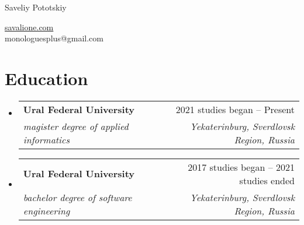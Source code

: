 \documentclass[letterpaper,11pt]{article}
\makeatletter
\newcommand{\resumeItem}[1]{
    \item{
                {#1 \vspace{-4pt}}
          }
}
\newcommand{\resumeSubheading}[4]{
    \vspace{-2pt}\item
    \begin{tabular*}{0.97\textwidth}[t]{l@{\extracolsep{\fill}}r}
        \textbf{#1} & #2 \\
        \textit{\small #3} & \textit{\small #4} \\
    \end{tabular*}\vspace{-10pt}
}
\newcommand{\resumeSubHeadingListStart}{\begin{itemize}[leftmargin=0.15in, label={}]}
\newcommand{\resumeSubHeadingListEnd}{\end{itemize}}
\newcommand{\resumeItemListStart}{\begin{itemize}}
\newcommand{\resumeItemListEnd}{\end{itemize}\vspace{-2pt}}
\makeatother
\begin{document}
\begin{center}
    {\LARGE Saveliy Pototskiy} \\ \vspace{0pt}
    \begin{multicols}{2}
        \begin{flushleft}
        \end{flushleft}

        \begin{flushright}
            \href{https://savalione.com}{savalione.com} \\

            \href{mailto:{monologuesplus@gmail.com}} \large{monologuesplus@gmail.com}
        \end{flushright}
    \end{multicols}
\end{center}

\section{Education}
\resumeSubHeadingListStart

\resumeSubheading
    {Ural Federal University}{2021 studies began -- Present}
    {magister degree of applied informatics}{Yekaterinburg, Sverdlovsk Region, Russia}
\resumeSubheading
    {Ural Federal University}{2017 studies began -- 2021 studies ended}
    {bachelor degree of software engineering}{Yekaterinburg, Sverdlovsk Region, Russia}

\resumeSubHeadingListEnd


\end{document}
